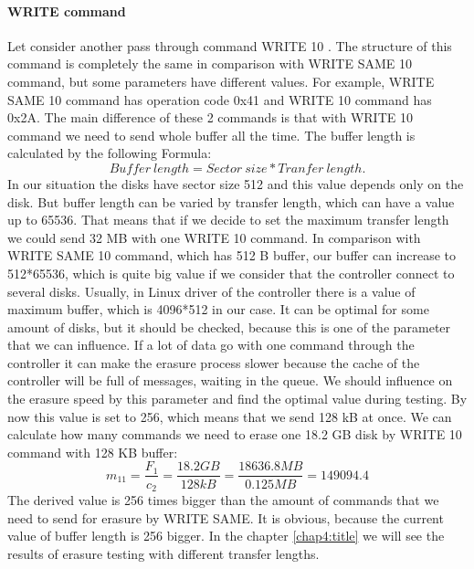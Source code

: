 \paragraph{WRITE command}
Let consider another pass through command WRITE 10 \cite{scsi3_bc}. The structure of this command is completely the same in comparison with WRITE SAME 10 command, but some parameters have different values. For example, WRITE SAME 10 command has operation code 0x41 and WRITE 10 command has 0x2A. The main difference of these 2 commands is that with WRITE 10 command we need to send whole buffer all the time. The buffer length is calculated by the following Formula:
\begin{equation}
	Buffer~length = Sector~size * Tranfer~length.
\end{equation}
In our situation the disks have sector size 512 and this value depends only on the disk. But buffer length can be varied by transfer length, which can have a value up to 65536. That means that if we decide to set the maximum transfer length we could send 32 MB with one WRITE 10 command. In comparison with WRITE SAME 10 command, which has 512 B buffer, our buffer can increase to 512*65536, which is quite big value if we consider that the controller connect to several disks. Usually, in Linux driver of the controller there is a value of maximum buffer, which is 4096*512 in our case. It can be optimal for some amount of disks, but it should be checked, because this is one of the parameter that we can influence.
If a lot of data go with one command through the controller it can make the erasure process slower because the cache of the controller will be full of messages, waiting in the queue. We should influence on the erasure speed by this parameter and find the optimal value during testing. By now this value is set to 256, which means that we send 128 kB at once. We can calculate how many commands we need to erase one 18.2 GB disk by WRITE 10 command with 128 KB buffer:
\begin{equation}
	m_{11}=\frac{F_{1}}{c_{2}}=\frac{18.2GB}{128kB}=\frac{18636.8MB}{0.125MB}=149094.4
\end{equation}
The derived value is 256 times bigger than the amount of commands that we need to send for erasure by WRITE SAME. It is obvious, because the current value of buffer length is 256 bigger. In the chapter  \ref{chap4:title} we will see the results of erasure testing with different transfer lengths.














